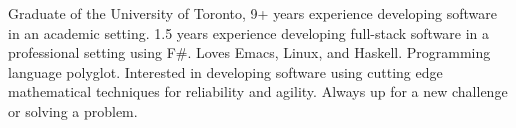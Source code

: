 

\begin{cvparagraph}

  Graduate of the University of Toronto, 9+ years experience developing software
  in an academic setting. 1.5 years experience developing full-stack software in
  a professional setting using F\#. Loves Emacs, Linux, and Haskell. Programming language
  polyglot. Interested in developing software using cutting edge mathematical
  techniques for reliability and agility. Always up for a new challenge or
  solving a problem.
\end{cvparagraph}
